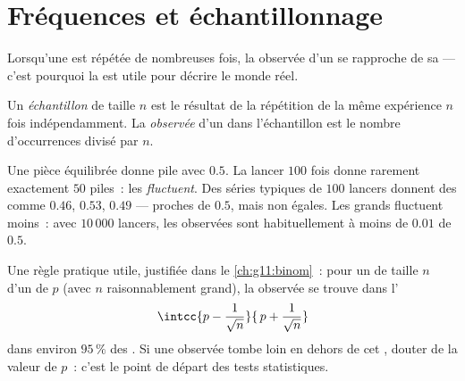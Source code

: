 \section{Fréquences et échantillonnage}

Lorsqu'une  est répétée de nombreuses fois, la
 observée d'un  se rapproche de sa  --- c'est
pourquoi la  est utile pour décrire le monde réel.

\begin{definition}[Échantillon]\label{def:g10:proba:sample}
Un \emph{échantillon} de taille $n$ est le résultat de
la répétition de la même expérience $n$ fois indépendamment. La
\emph{ observée} d'un  dans l'échantillon est le nombre
d'occurrences divisé par $n$.
\end{definition}

\begin{example}\label{ex:g10:proba:sampling}
Une pièce équilibrée donne pile avec  $0.5$. La lancer $100$
fois donne rarement exactement $50$ piles~: les 
\emph{fluctuent}. Des séries typiques de $100$ lancers donnent des
 comme $0.46$, $0.53$, $0.49$ --- proches de $0.5$, mais non
égales. Les grands  fluctuent moins~: avec $10\,000$
lancers, les  observées sont habituellement à moins de $0.01$
de $0.5$.
\end{example}

\begin{remark}
Une règle pratique utile, justifiée dans le \cref{ch:g11:binom}~: pour un
 de taille $n$ d'un  de  $p$ (avec $n$
raisonnablement grand), la  observée se trouve dans l'
\[
\intcc{p - \frac{1}{\sqrt n}}{\,p + \frac{1}{\sqrt n}}
\]
dans environ $95\,\%$ des . Si une  observée tombe
loin en dehors de cet , douter de la valeur de $p$~: c'est le
point de départ des tests statistiques.
\end{remark}

